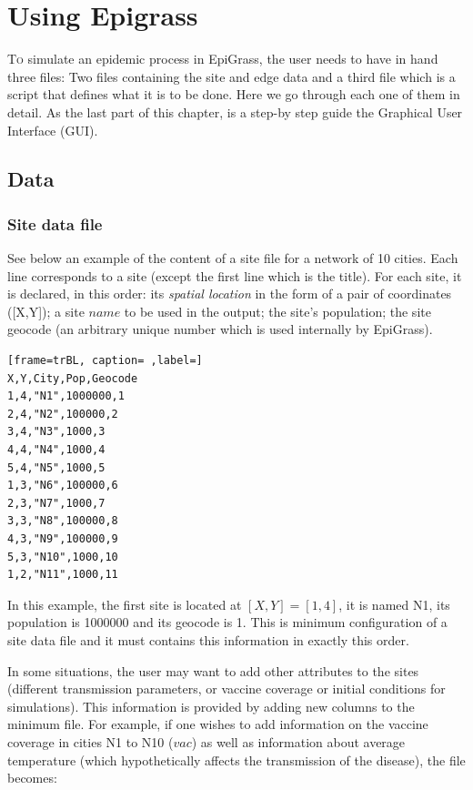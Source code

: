 \chapter{Using Epigrass} 
\label{ch:usingepg}

\lettrine{T}{o} simulate an epidemic process in EpiGrass, the user needs to have in hand three files: Two files containing the site and edge data and a third file which is a script that defines what it is to be done. Here we go through each one of them in detail. As the last part of this chapter, is a step-by step guide the Graphical User Interface (GUI).

\section{Data}

\subsection{Site data file}
See below an example of the content of a site file for a network of 10 cities. Each line corresponds to a site (except the first line which is the title). For each site, it is declared, in this order: its \textit{spatial location} in the form of a pair of coordinates ([X,Y]); a site $name$ to be used in the output; the site's population; the site geocode (an arbitrary unique number which is used internally by EpiGrass).

\begin{lstlisting}[frame=trBL, caption= ,label=]
X,Y,City,Pop,Geocode
1,4,"N1",1000000,1
2,4,"N2",100000,2
3,4,"N3",1000,3
4,4,"N4",1000,4
5,4,"N5",1000,5
1,3,"N6",100000,6
2,3,"N7",1000,7
3,3,"N8",100000,8
4,3,"N9",100000,9
5,3,"N10",1000,10
1,2,"N11",1000,11
\end{lstlisting}

In this example, the first site is located at $[X,Y]=[1,4]$, it is named N1, its population is 1000000 and its geocode is 1. This is minimum configuration of a site data file and it must contains this information in exactly this order. 

In some situations, the user may want to add other attributes to the sites (different transmission parameters, or vaccine coverage or initial conditions for simulations). This information is provided by adding new columns to the minimum file. For example, if one wishes to add information on the vaccine coverage in cities N1 to N10 ($vac$) as well as information about average temperature (which hypothetically affects the transmission of the disease), the file becomes:

